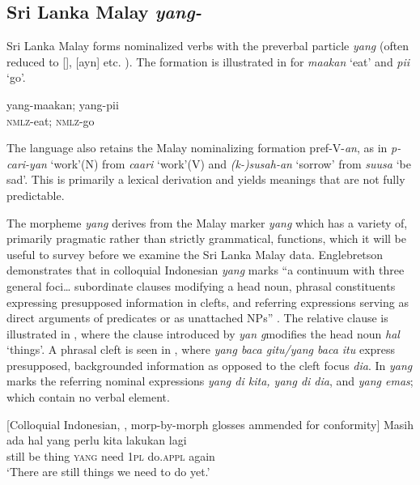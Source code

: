 \subsection{Sri Lanka Malay \textit{yang-}}

Sri Lanka Malay forms nominalized verbs with the preverbal particle \textit{yang} (often reduced to [{\textltailn}{\textschwa}], [ayn] etc. ). The formation is illustrated in  for \textit{maakan }`eat' and \textit{pii} `go'. 

\ea\label{smith:ex:62}
\gll yang-maakan; yang-pii\\
\textsc{nmlz}-eat; \textsc{nmlz}-go\\
\z

The language also retains the Malay nominalizing formation pref-V-\textit{an}, as in \textit{p{\textschwa}-cari-yan} `work'(N) from \textit{caari} `work'(V) and \textit{(k{\textschwa}-)susah-an} `sorrow' from \textit{suusa} `be sad'. This is primarily a lexical derivation and yields meanings that are not fully predictable.

The morpheme \textit{yang} derives from the Malay marker \textit{yang} which has a variety of, primarily pragmatic rather than strictly grammatical, functions, which it will be useful to survey before we examine the Sri Lanka Malay data. Englebretson demonstrates that in colloquial Indonesian \textit{yang} marks ``a continuum with three general foci{\dots} subordinate clauses modifying a head noun, phrasal constituents expressing presupposed information in clefts, and referring expressions serving as direct arguments of predicates or as unattached NPs''  \citep[24]{Englebretson2008}. The relative clause is illustrated in , where the clause introduced by \textit{yan g}modifies the head noun \textit{hal }`things'. A phrasal cleft is seen in , where \textit{yang baca gitu/yang baca itu} express presupposed, backgrounded information as opposed to the cleft focus \textit{dia}. In  \textit{yang} marks the referring nominal expressions \textit{yang di kita, yang di dia}, and \textit{yang emas}; which contain no verbal element. 

\ea\label{smith:ex:63}
{}[Colloquial Indonesian, \citet[9]{Englebretson2008}, morp-by-morph glosses ammended for conformity]
\gll Masih ada hal yang perlu kita lakukan lagi\\
still be thing \textsc{yang} need 1\textsc{pl} do.\textsc{appl} again\\
`There are still things we need to do yet.' 
\z


